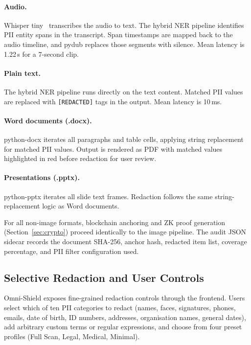 \documentclass[conference]{IEEEtran}
\begin{document}
\paragraph{Audio.}
Whisper tiny~\cite{radford2022whisper} transcribes
the audio to text.
The hybrid NER pipeline identifies PII entity spans
in the transcript.
Span timestamps are mapped back to the audio timeline,
and pydub replaces those segments with silence.
Mean latency is 1.22\,s for a 7-second clip.

\paragraph{Plain text.}
The hybrid NER pipeline runs directly on the text
content.
Matched PII values are replaced with
\texttt{[REDACTED]} tags in the output.
Mean latency is 10\,ms.

\paragraph{Word documents (.docx).}
python-docx iterates all paragraphs and table cells,
applying string replacement for matched PII values.
Output is rendered as PDF with matched values
highlighted in red before redaction for user review.

\paragraph{Presentations (.pptx).}
python-pptx iterates all slide text frames.
Redaction follows the same string-replacement logic
as Word documents.

For all non-image formats, blockchain anchoring and
ZK proof generation (Section~\ref{sec:crypto})
proceed identically to the image pipeline.
The audit JSON sidecar records the document SHA-256,
anchor hash, redacted item list, coverage percentage,
and PII filter configuration used.

\subsection{Selective Redaction and User Controls}

Omni-Shield exposes fine-grained redaction controls
through the frontend.
Users select which of ten PII categories to redact
(names, faces, signatures, phones, emails, date of
birth, ID numbers, addresses, organisation names,
general dates), add arbitrary custom terms or regular
expressions, and choose from four preset profiles
(Full Scan, Legal, Medical, Minimal).
\end{document}
